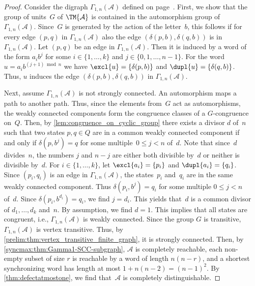 \begin{proof}
	Consider the digraph $\Gamma_{1,n}(\mathcal A)$ defined on page~\pageref{def:Gamma1i-graph}.
	First, we show that the group of units~$G$ of $\TM{\mathcal A}$ is contained in the 
	automorphism group of $\Gamma_{1,n}(\mathcal A)$.
	Since~$G$ is generated 
	by the action of the letter~$b$, this follows if for every edge $(p,q)$ in $\Gamma_{1,n}(\mathcal A)$
	also the edge $(\delta(p, b), \delta(q, b))$ is in $\Gamma_{1,n}(\mathcal A)$.	
	Let $(p, q)$ be an edge in $\Gamma_{1,n}(\mathcal A)$.
	Then it is induced by a word of the form $a_i b^{j}$
	for some $i \in \{1,\ldots,k\}$ and $j \in \{0,1,\ldots,n-1\}$.
	For the word $u = a_i b^{(j+1) \bmod n}$
	we have $\excl{u} = \{ \delta(p, b)\}$
	and $\dupl{u} = \{ \delta(q, b) \}$.
	Thus, $u$ induces the edge $(\delta(p, b), \delta(q, b))$ in $\Gamma_{1,n}(\mathcal A)$.
		
	Next, assume $\Gamma_{1,n}(\mathcal A)$ is not strongly connected.
	An automorphism maps a path to another path.
	Thus, since the elements from~$G$ act as automorphisms, 
	the weakly connected components form the congruence classes of
	a $G$-congruence on~$Q$.
	Then, by \cref{lem:congruence_on_cyclic_group} there exists a divisor $d$ of~$n$ such that
	two states $p,q \in Q$ are in a common weakly connected component
	if and only if $\delta(p, b^j) = q$
	for some multiple~$0 \le j < n$ of~$d$.
	Note that since~$d$ divides~$n$, the numbers
	$j$ and $n - j$ are either both divisible by~$d$
	or neither is divisible by~$d$.	
	For $i \in \{1,\ldots,k\}$,
	let $\excl{a_i} = \{p_i\}$
	and $\dupl{a_i} = \{q_i\}$.
	Since $(p_i, q_i)$ is an edge in $\Gamma_{1,n}(\mathcal A)$,
	the states~$p_i$ and~$q_i$ are in the same weakly connected component.
	Thus $\delta(p_i, b^j) = q_i$ for some multiple $0 \le j < n$ of~$d$.
	Since $\delta(p_i, b^{d_i}) = q_i$,
	we find $j = d_i$.
	This yields that~$d$ is a common divisor
	of $d_1, \ldots, d_k$ and~$n$.
	By assumption, we find $d = 1$. This implies that all states
	are congruent, i.e., $\Gamma_{1,n}(\mathcal A)$ is weakly connected.
	Since the group $G$ is transitive, $\Gamma_{1,n}(\mathcal A)$ is vertex transitive.
	Thus, by \cref{prelim:thm:vertex_transitive_finite_graph}, it is strongly connected.
	Then, by \cref{syncmax:thm:Gamma1-SCC-subgraph}, 
	$\mathcal A$ is completely reachable,
	each non-empty subset of size $r$ is reachable by a word of length $n(n - r)$,
	and a shortest synchronizing word has length at most $1 + n(n-2) = (n-1)^2$.
	By \cref{thm:defectatmostone}, we find that~$\mathcal A$ is completely distinguishable.
\end{proof}

